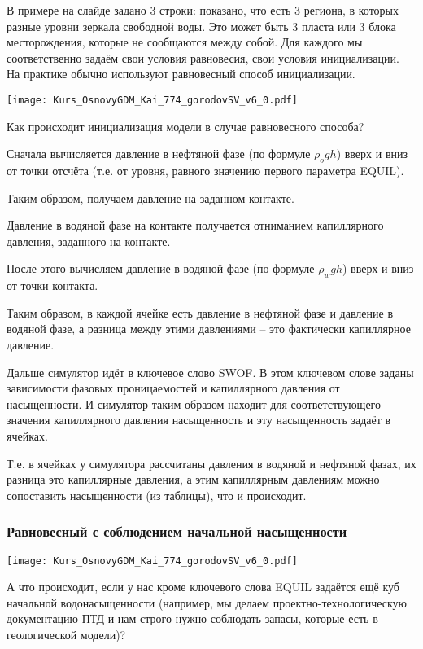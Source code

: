 \documentclass[main.tex]{subfiles}
\begin{document}
В примере на слайде задано 3 строки: показано, что есть 3 региона, в которых разные уровни зеркала свободной воды.
Это может быть 3 пласта или 3 блока месторождения, которые не сообщаются между собой.
Для каждого мы соответственно задаём свои условия равновесия, свои условия инициализации.
\\

На практике обычно используют равновесный способ инициализации.

\texttt{[image: Kurs\_OsnovyGDM\_Kai\_774\_gorodovSV\_v6\_0.pdf]}

Как происходит инициализация модели в случае равновесного способа?

Сначала вычисляется давление в нефтяной фазе (по формуле $\rho_o gh$) вверх и вниз от точки отсчёта (т.е. от уровня, равного значению первого параметра EQUIL).

Таким образом, получаем давление на заданном контакте.

Давление в водяной фазе на контакте получается отниманием капиллярного давления, заданного на контакте.

После этого вычисляем давление в водяной фазе (по формуле $\rho_w gh$) вверх и вниз от точки контакта.

Таким образом, в каждой ячейке есть давление в нефтяной фазе и давление в водяной фазе, а разница между этими давлениями -- это фактически капиллярное давление.

Дальше симулятор идёт в ключевое слово SWOF.
В этом ключевом слове заданы зависимости фазовых проницаемостей и капиллярного давления от насыщенности.
И симулятор таким образом находит для соответствующего значения капиллярного давления насыщенность и эту насыщенность задаёт в ячейках.

Т.е. в ячейках у симулятора рассчитаны давления в водяной и нефтяной фазах, их разница это капиллярные давления, а этим капиллярным давлениям можно сопоставить насыщенности (из таблицы), что и происходит.

\subsubsection{Равновесный с соблюдением начальной насыщенности}

\texttt{[image: Kurs\_OsnovyGDM\_Kai\_774\_gorodovSV\_v6\_0.pdf]}

А что происходит, если у нас кроме ключевого слова EQUIL задаётся ещё куб начальной водонасыщенности (например, мы делаем проектно-технологическую документацию ПТД и нам строго нужно соблюдать запасы, которые есть в геологической модели)?
\\
\end{document}
